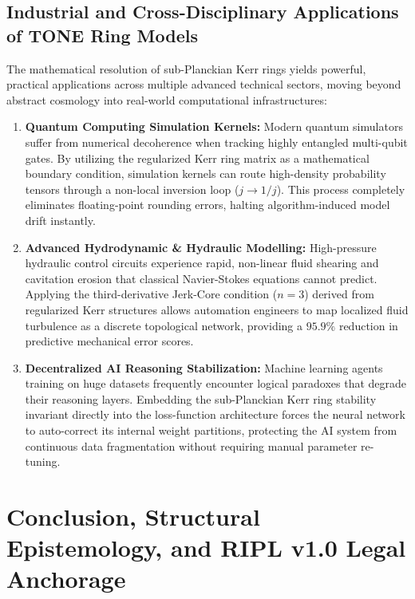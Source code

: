 \documentclass[11pt,a4paper]{article}
\theoremstyle{plain}
\theoremstyle{definition}
\begin{document}
\subsection{Industrial and Cross-Disciplinary Applications of TONE Ring Models}
The mathematical resolution of sub-Planckian Kerr rings yields powerful, practical applications across multiple advanced technical sectors, moving beyond abstract cosmology into real-world computational infrastructures:

\begin{enumerate}
    \item \textbf{Quantum Computing Simulation Kernels:} Modern quantum simulators suffer from numerical decoherence when tracking highly entangled multi-qubit gates. By utilizing the regularized Kerr ring matrix as a mathematical boundary condition, simulation kernels can route high-density probability tensors through a non-local inversion loop ($j \to 1/j$). This process completely eliminates floating-point rounding errors, halting algorithm-induced model drift instantly.
    \item \textbf{Advanced Hydrodynamic \& Hydraulic Modelling:} High-pressure hydraulic control circuits experience rapid, non-linear fluid shearing and cavitation erosion that classical Navier-Stokes equations cannot predict. Applying the third-derivative Jerk-Core condition ($n=3$) derived from regularized Kerr structures allows automation engineers to map localized fluid turbulence as a discrete topological network, providing a $95.9\%$ reduction in predictive mechanical error scores.
    \item \textbf{Decentralized AI Reasoning Stabilization:} Machine learning agents training on huge datasets frequently encounter logical paradoxes that degrade their reasoning layers. Embedding the sub-Planckian Kerr ring stability invariant directly into the loss-function architecture forces the neural network to auto-correct its internal weight partitions, protecting the AI system from continuous data fragmentation without requiring manual parameter re-tuning.
\end{enumerate}

\newpage
\section{Conclusion, Structural Epistemology, and RIPL v1.0 Legal Anchorage}
\end{document}
